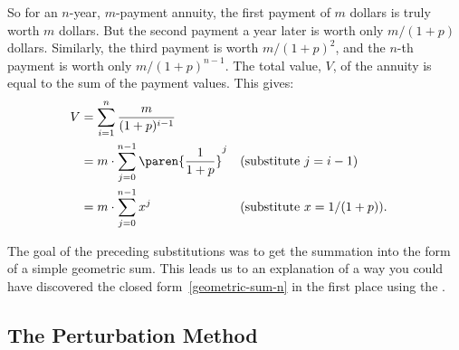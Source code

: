 So for an $n$-year, $m$-payment annuity, the first payment of $m$ dollars
is truly worth $m$ dollars.  But the second payment a year later is worth
only $m/(1+p)$ dollars.  Similarly, the third payment is worth
$m/(1+p)^2$, and the $n$-th payment is worth only $m/(1+p)^{n-1}$.  The
total value, $V$, of the annuity is equal to the sum of the payment
values.  This gives:
\begin{align}
  V & = \sum_{i=1}^n \frac{m}{(1+p)^{i-1}}\notag\\
  & = m \cdot \sum_{j=0}^{n-1} \paren{\frac{1}{1+p}}^j
          && \text{(substitute $j = i-1$)}\notag\\
  & = m \cdot \sum_{j=0}^{n-1} x^j
          && \text{(substitute $x = 1/(1+p)$)}.\label{jn-1xsum}
\end{align}

The goal of the preceding substitutions was to get the summation into
the form of a simple geometric sum.  This leads us to an explanation
of a way you could have discovered the closed
form~\eqref{geometric-sum-n} in the first place using the
.

\iffalse
So we'll take this opportunity
to describe a method that you could use to figure it out for yourself.
It is called the \term{Perturbation Method}.


 form so that we can solve it with a general formula.

In particular, the terms of the sum
\[
    \sum_{j = 0}^{n - 1} x^j = 1 + x + x^2 + x^3 + \cdots + x^{n - 1}
\]
form a \term{geometric series}, which means that the ratio of
consecutive terms is always the same and it is a positive value less
than one.  In this case, the ratio is always~$x$, and $0 < x < 1$
since we assumed that~$p > 0$.  It turns out that there is a nice
closed-form expression for any geometric series; namely
\begin{equation}\label{geometric-sum-n-1}
    \sum_{i = 0}^{n - 1} x^i = \frac{1 - x^n}{1 - x}.
\end{equation}

Equation~\ref{geometric-sum-n-1} can be verified by induction, but, as
is often the case, the proof by induction gives no hint about how the
formula was found in the first place.  So we'll take this opportunity
to describe a method that you could use to figure it out for yourself.
It is called the \term{Perturbation Method}.
\fi

\subsection{The Perturbation Method}\label{sec:perturbation}

